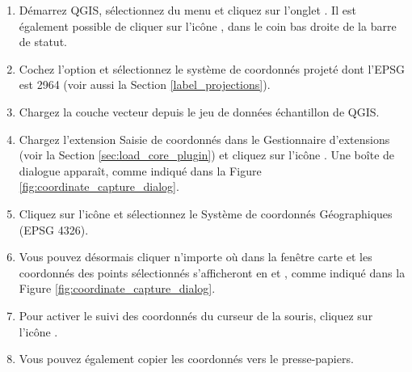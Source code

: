 \begin{enumerate}
  \item Démarrez QGIS, sélectionnez  du menu
   et cliquez sur l'onglet . 
  Il est également possible de cliquer sur l'icône , dans le coin bas droite de la barre de statut.
  \item Cochez l'option  et sélectionnez le système
  de coordonnés projeté  dont l'EPSG est 2964 (voir aussi 
  la Section \ref{label_projections}).
  \item Chargez la couche vecteur  depuis le jeu de données échantillon de QGIS.
  \item Chargez l'extension Saisie de coordonnés dans le Gestionnaire d'extensions (voir la Section
  \ref{sec:load_core_plugin}) et cliquez sur l'icône .
  Une boîte de dialogue apparaît, comme indiqué dans la Figure \ref{fig:coordinate_capture_dialog}.
  \item Cliquez sur l'icône  et sélectionnez le Système de coordonnés Géographiques  (EPSG 4326).
  \item Vous pouvez désormais cliquer n'importe où dans la fenêtre carte et les coordonnés des points 
  sélectionnés s'afficheront en  et , comme indiqué dans la
  Figure \ref{fig:coordinate_capture_dialog}.
  \item Pour activer le suivi des coordonnés du curseur de la souris, cliquez sur l'icône .
  \item Vous pouvez également copier les coordonnés vers le presse-papiers.
\end{enumerate}

\newpage